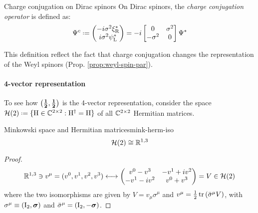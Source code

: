 \begin{definition}{Charge conjugation on Dirac spinors}{}
  On Dirac spinors, the \textit{charge conjugation operator} is defined as:
  \begin{equation}
    \Psi^c \defeq
    \begin{pmatrix}
      - i \sigma^2 \xi_\text{R}^* \\
      i \sigma^2 \psi_\text{L}^*
    \end{pmatrix}
    = -i
    \begin{bmatrix}
      0 & \sigma^2 \\ -\sigma^2 & 0
    \end{bmatrix}
    \Psi^*
    \label{eq:dir-spin-charge-conj}
  \end{equation}
\end{definition}

This definition reflect the fact that charge conjugation changes the representation of the Weyl spinors (Prop. \ref{prop:weyl-spin-par}).

\paragraph{4-vector representation}

To see how $ \mathbf{\left( \frac{1}{2},\frac{1}{2} \right)} $ is the 4-vector representation, consider the space $ \mathcal{H}(2) \defeq \{\tens{H} \in \C^{2 \times 2} : \tens{H}\dg = \tens{H}\} $ of all $ \mathbb{C}^{2 \times 2} $ Hermitian matrices.

\begin{lemma}{Minkowski space and Hermitian matrices}{mink-herm-iso}
  \begin{equation}
    \mathcal{H}(2) \cong \mathbb{R}^{1,3}
  \end{equation}

  \tcblower

  \begin{proof}
    \begin{equation*}
      \mathbb{R}^{1,3} \ni v^\mu = (v^0,v^1,v^2,v^3) \longleftrightarrow
      \begin{pmatrix}
        v^0 - v^3 & -v^1 + i v^2 \\
        -v^1 - i v^2 & v^0 + v^3
      \end{pmatrix}
      = V \in \mathcal{H}(2)
    \end{equation*}
    where the two isomorphisms are given by $ V = v_\mu \sigma^\mu $ and $ v^\mu = \frac{1}{2} \operatorname{tr} \left( \bar{\sigma}^\mu V \right) $, with $ \sigma^\mu \equiv (\mathrm{I}_2,\boldsymbol{\sigma}) $ and $ \bar{\sigma}^\mu = (\mathrm{I}_2,-\boldsymbol{\sigma}) $.
  \end{proof}
\end{lemma}

